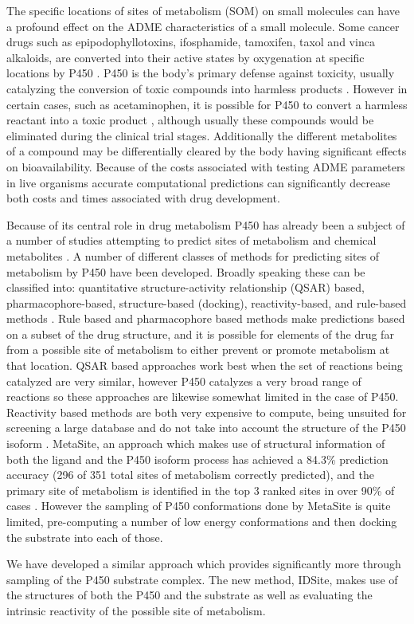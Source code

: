The specific locations of sites of metabolism (SOM) on small molecules can have a profound effect on the ADME characteristics of a small molecule.
Some cancer drugs such as epipodophyllotoxins, ifosphamide, tamoxifen, taxol and vinca alkaloids, are converted into their active states by oxygenation at specific locations by P450 \cite{kivisto1995role}.
P450 is the body's primary defense against toxicity, usually catalyzing the conversion of toxic compounds into harmless products \cite{gonzalez2005role,guengerich2001common}.
However in certain cases, such as acetaminophen, it is possible for P450 to convert a harmless reactant into a toxic product \cite{chen1998oxidation}, although usually these compounds would be eliminated during the clinical trial stages.
Additionally the different metabolites of a compound may be differentially cleared by the body having significant effects on bioavailability.
Because of the costs associated with testing ADME parameters in live organisms accurate computational predictions can significantly decrease both costs and times associated with drug development.

Because of its central role in drug metabolism P450 has already been a subject of a number of studies attempting to predict sites of metabolism and chemical metabolites \cite{afzelius2007state}.
A number of different classes of methods for predicting sites of metabolism by P450 have been developed.
Broadly speaking these can be classified into: quantitative structure-activity relationship (QSAR) based, pharmacophore-based, structure-based (docking), reactivity-based, and rule-based methods \cite{cruciani2005metasite}.
Rule based and pharmacophore based methods make predictions based on a subset of the drug structure, and it is possible for elements of the drug far from a possible site of metabolism to either prevent or promote metabolism at that location.
QSAR based approaches work best when the set of reactions being catalyzed are very similar, however P450 catalyzes a very broad range of reactions so these approaches are likewise somewhat limited in the case of P450.
Reactivity based methods are both very expensive to compute, being unsuited for screening a large database and do not take into account the structure of the P450 isoform \cite{singh2003model,chen1997oxidative,de2002factors}.
MetaSite, an approach which makes use of structural information of both the ligand and the P450 isoform process has achieved a 84.3\% prediction accuracy (296 of 351 total sites of metabolism correctly predicted), and the primary site of metabolism is identified in the top 3 ranked sites in over 90\% of cases \cite{cruciani2005metasite}.
However the sampling of P450 conformations done by MetaSite is quite limited, pre-computing a number of low energy conformations and then docking the substrate into each of those.

We have developed a similar approach which provides significantly more through sampling of the P450 substrate complex.
The new method, IDSite, makes use of the structures of both the P450 and the substrate as well as evaluating the intrinsic reactivity of the possible site of metabolism. 
